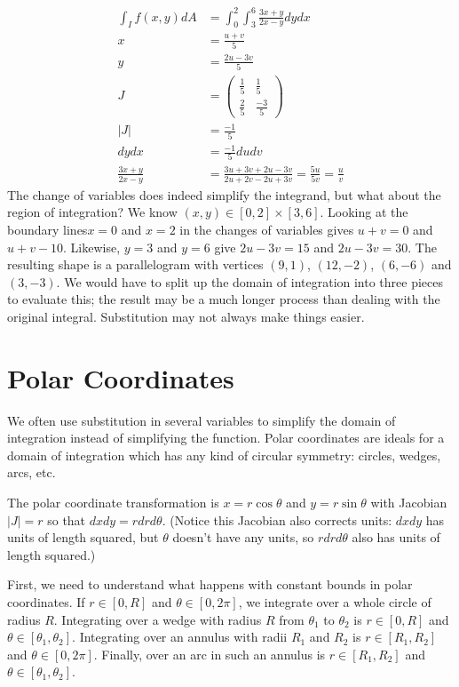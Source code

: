 \documentclass[fleqn,letterpaper]{report}
\begin{document}
\begin{example}
\begin{align*}
\int_I f(x,y) dA & = \int_0^2 \int_3^6 \frac{3x+y}{2x-y} dy dx
\\
x & = \frac{u+v}{5} \\
y & = \frac{2u-3v}{5} \\
J & = \left( \begin{matrix} \frac{1}{5} & \frac{1}{5} \\
\frac{2}{5} & \frac{-3}{5} \end{matrix}
\right) \\
|J| & = \frac{-1}{5} \\
dy dx & = \frac{-1}{5} du dv \\
\frac{3x+y}{2x-y} & = \frac{3u+3v+2u -3v}{2u + 2v -2u + 3v} =
\frac{5u}{5v} = \frac{u}{v} 
\end{align*}
The change of variables does indeed simplify the integrand,
but what about the region of integration? We know $(x,y) \in
[0,2] \times [3,6]$. Looking at the boundary lines$x=0$ and
$x=2$ in the changes of variables gives $u+v=0$ and $u+v-10$.
Likewise, $y=3$ and $y=6$ give $2u-3v=15$ and $2u-3v=30$. The
resulting shape is a parallelogram with vertices $(9,1)$,
$(12,-2)$, $(6,-6)$ and $(3,-3)$. We would have to split up
the domain of integration into three pieces to evaluate this;
the result may be a much longer process than dealing with the
original integral. Substitution may not always make things
easier.
\end{example}

\section{Polar Coordinates}
\label{polar-coordinates}

We often use substitution in several variables to simplify the
domain of integration instead of simplifying the function.
Polar coordinates are ideals for a domain of integration which
 has any kind of circular symmetry: circles, wedges, arcs,
etc.

The polar coordinate transformation is $x = r \cos \theta$ and
$y = r \sin \theta$ with Jacobian $|J| = r $ so that $dx dy =
r dr d\theta$. (Notice this Jacobian also corrects units: $dx
dy$ has units of length squared, but $\theta$ doesn't have any
units, so $r dr d\theta$ also has units of length squared.)

First, we need to understand what happens with constant bounds
in polar coordinates. If $r \in [0,R]$ and $\theta \in [0,
2\pi]$, we integrate over a whole circle of radius $R$.
Integrating over a wedge with radius $R$ from $\theta_1$ to
$\theta_2$ is $r \in [0,R]$ and $\theta \in [\theta_1,
\theta_2]$. Integrating over an annulus with radii $R_1$ and
$R_2$ is $r \in [R_1, R_2]$ and $\theta \in [0, 2\pi]$.
Finally, over an arc in such an annulus is $r \in [R_1, R_2]$
and $\theta \in [\theta_1, \theta_2]$.
\end{document}
